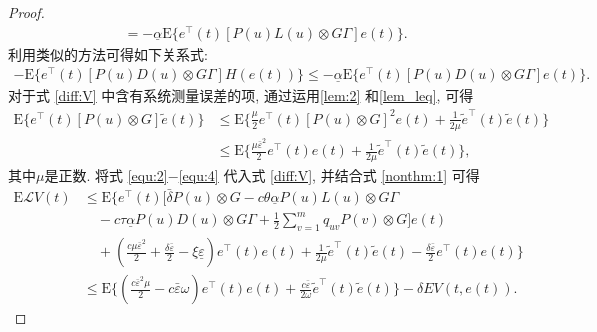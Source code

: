 \begin{proof}
\begin{align}
             &=-\underline{\alpha}\mathrm{E}\Big\{ e^{\top}(t)[P(u)L(u)\otimes G\Gamma]e(t)\Big\}.
            \end{align}
        利用类似的方法可得如下关系式:
            \begin{align}\label{equ:3}
            -\mathrm{E}\Big\{e^{\top}(t)[P(u)D(u)\otimes G\Gamma]H(e(t))\Big\}\leq-\underline{\alpha} \mathrm{E}\Big\{e^{\top}(t)[P(u)D(u)\otimes G\Gamma]e(t)\Big\}.
            \end{align}
        对于式 \eqref{diff:V} 中含有系统测量误差的项, 通过运用\autoref{lem:2} 和\autoref{lem_leq}, 可得
            \begin{align}\label{equ:4}
            \nonumber \mathrm{E}\Big\{e^{\top}(t)[P(u)\otimes G]\tilde{e}(t)\Big\}&\leq \mathrm{E}\Big\{\frac{\mu}{2}e^{\top}(t)[P(u)\otimes G]^2e(t)+\frac{1}{2\mu}\tilde{e}^{\top}(t)\tilde{e}(t)\Big\}\\
            &\leq \mathrm{E}\Big\{\frac{\mu\bar{\varepsilon}^2}{2}e^{\top}(t)e(t)+\frac{1}{2\mu}\tilde{e}^{\top}(t)\tilde{e}(t)\Big\},
            \end{align}
            其中$\mu$是正数. 将式 \eqref{equ:2}$-$\eqref{equ:4} 代入式 \eqref{diff:V}, 并结合式 \eqref{nonthm:1} 可得
            \begin{align}\label{equ:5}
            \nonumber \mathrm{E}\mathcal{L}V(t)&\leq \mathrm{E}\Big\{e^{\top}(t)\Big[\bar{\delta}P(u)\otimes G-c\theta\underline{\alpha} P(u)L(u)\otimes G\Gamma\\
            \nonumber &\quad-c\tau\underline{\alpha} P(u)D(u)\otimes G\Gamma+\frac{1}{2}\sum_{v=1}^{m}q_{uv}P(v)\otimes G\Big]e(t)\\
            \nonumber &\quad+(\frac{c\mu\bar{\varepsilon}^2}{2}+\frac{\delta\bar{\varepsilon}}{2}-\xi\underline{\varepsilon}) e^{\top}(t)e(t)
            +\frac{1}{2\mu}\tilde{e}^{\top}(t)\tilde{e}(t)-\frac{\delta\bar{\varepsilon}}{2}e^{\top}(t)e(t)\Big\}\\
            &\leq \mathrm{E}\Big\{(\frac{c\bar{\varepsilon}^2\mu}{2}-c\bar{\varepsilon}\omega)e^\top(t)e(t)+\frac{c\bar{\varepsilon}}{2\omega}\tilde{e}^{\top}(t)\tilde{e}(t)\Big\}
            -\delta EV(t,e(t)).
            \end{align}


\end{proof}
